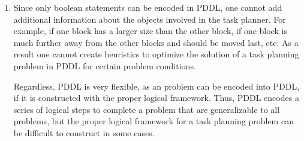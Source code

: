\documentclass[11pt]{article}
\begin{document}
\begin{enumerate}[leftmargin=0.3in]
\begin{enumerate}
       \item Since only boolean statements can be encoded in PDDL, one cannot add additional information about the objects involved in the task planner. For example, if one block has a larger size than the other block, if one block is much further away from the other blocks and should be moved last, etc. As a result one cannot create heuristics to optimize the solution of a task planning problem in PDDL for certain problem conditions. 

           Regardless, PDDL is very flexible, as an problem can be encoded into PDDL, if it is constructed with the proper logical framework. Thus, PDDL encodes a series of logical steps to complete a problem that are generalizable to all problems, but the proper logical framework for a task planning problem can be difficult to construct in some cases.

   \end{enumerate} %

\end{enumerate}
\end{document}
